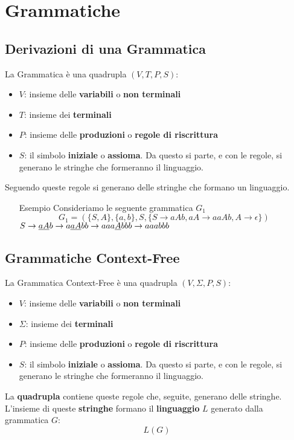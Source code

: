 \documentclass[12pt]{extarticle}
\begin{document}
\section{Grammatiche}
\subsection{Derivazioni di una Grammatica}
La Grammatica è una quadrupla $(V,T,P,S)$:
\begin{itemize}
    \item $V$: insieme delle \textbf{variabili} o \textbf{non terminali}
    \item $T$: insieme dei \textbf{terminali}
    \item $P$: insieme delle \textbf{produzioni} o \textbf{regole di riscrittura}
    \item $S$: il simbolo \textbf{iniziale} o \textbf{assioma}. Da questo si parte, e con le regole, si generano le stringhe che formeranno il linguaggio.
\end{itemize}
Seguendo queste regole si generano delle stringhe che formano un linguaggio.
\begin{itemize}
    \item[Esempio] Consideriamo le seguente grammatica $G_1$
    \begin{equation*}
        G_1=(\{S,A\},\{a,b\},S,\{S \rightarrow aAb,aA \rightarrow aaAb,A\rightarrow \epsilon\})
    \end{equation*}
    \begin{math}
        S \rightarrow \underline{aA}b\\
        \rightarrow a\underline{aA}bb\\
        \rightarrow aaa\underline{A}bbb\\
        \rightarrow aaabbb
    \end{math}
\end{itemize}

\subsection{Grammatiche Context-Free}
La Grammatica Context-Free è una quadrupla $(V,\Sigma,P,S)$:
\begin{itemize}
    \item $V$: insieme delle \textbf{variabili} o \textbf{non terminali}
    \item $\Sigma$: insieme dei \textbf{terminali}
    \item $P$: insieme delle \textbf{produzioni} o \textbf{regole di riscrittura}
    \item $S$: il simbolo \textbf{iniziale} o \textbf{assioma}. Da questo si parte, e con le regole, si generano le stringhe che formeranno il linguaggio.
\end{itemize}
La \textbf{quadrupla} contiene queste regole che, seguite, generano delle stringhe.\\
L'insieme di queste \textbf{stringhe} formano il \textbf{linguaggio} $L$ generato dalla grammatica $G$:
\begin{equation*}
    L(G)
\end{equation*}
\end{document}
